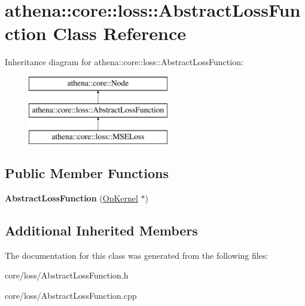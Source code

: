 \hypertarget{classathena_1_1core_1_1loss_1_1_abstract_loss_function}{}\section{athena\+:\+:core\+:\+:loss\+:\+:Abstract\+Loss\+Function Class Reference}
\label{classathena_1_1core_1_1loss_1_1_abstract_loss_function}
Inheritance diagram for athena\+:\+:core\+:\+:loss\+:\+:Abstract\+Loss\+Function\+:\begin{figure}[H]
\begin{center}
\leavevmode
\includegraphics[height=3.000000cm]{classathena_1_1core_1_1loss_1_1_abstract_loss_function}
\end{center}
\end{figure}
\subsection*{Public Member Functions}
\begin{DoxyCompactItemize}
\item 
\mbox{\label{classathena_1_1core_1_1loss_1_1_abstract_loss_function_afdb95a15043e5b1951417e6453edd539}} 
{\bfseries Abstract\+Loss\+Function} (\mbox{\hyperlink{classathena_1_1core_1_1_op_kernel}{Op\+Kernel}} $\ast$)
\end{DoxyCompactItemize}
\subsection*{Additional Inherited Members}


The documentation for this class was generated from the following files\+:\begin{DoxyCompactItemize}
\item 
core/loss/Abstract\+Loss\+Function.\+h\item 
core/loss/Abstract\+Loss\+Function.\+cpp\end{DoxyCompactItemize}
